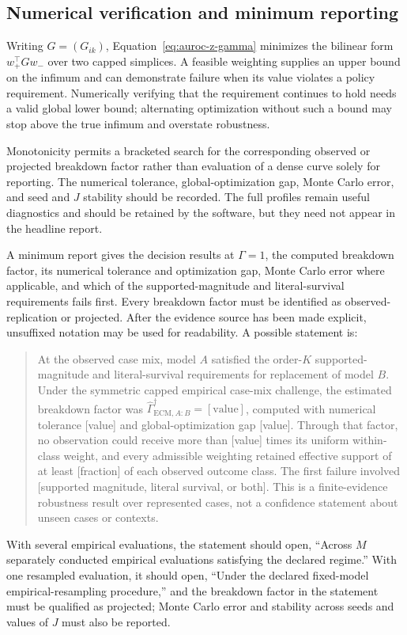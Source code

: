 \documentclass[11pt]{article}
\theoremstyle{remark}
\begin{document}
\subsection{Numerical verification and minimum reporting}

Writing $G=(G_{ik})$, Equation~\eqref{eq:auroc-z-gamma} minimizes the bilinear
form $w_+^\top G w_-$ over two capped simplices. A feasible weighting supplies
an upper bound on the infimum and can demonstrate failure when its value
violates a policy requirement. Numerically verifying that the requirement
continues to hold needs a valid global lower bound; alternating optimization
without such a bound may stop above the true infimum and overstate robustness.

Monotonicity permits a bracketed search for the corresponding observed or
projected breakdown factor rather than evaluation of a dense curve solely for
reporting. The numerical tolerance, global-optimization gap, Monte Carlo error,
and seed and $J$ stability should be recorded. The full profiles remain
useful diagnostics and should be retained by the software, but they need not
appear in the headline report.

A minimum report gives the decision results at $\Gamma=1$, the computed
breakdown factor, its numerical tolerance and optimization gap, Monte Carlo
error where applicable, and which of the supported-magnitude and
literal-survival requirements fails first. Every breakdown factor must be
identified as observed-replication or projected. After the evidence source has
been made explicit, unsuffixed notation may be used for readability. A possible
statement is:
\begin{quote}
At the observed case mix, model $A$ satisfied the order-$K$ supported-magnitude
and literal-survival requirements for replacement of model $B$. Under the
symmetric capped empirical case-mix challenge, the estimated breakdown
factor was $\widehat\Gamma_{\mathrm{ECM},A:B}^{\dagger}=[\text{value}]$,
computed with numerical tolerance [value] and global-optimization gap [value].
Through that factor, no observation could receive more than [value] times its
uniform within-class weight, and every admissible weighting retained effective
support of at least [fraction] of each observed outcome class. The first
failure involved [supported magnitude, literal survival, or both]. This is a
finite-evidence robustness result over represented cases, not a confidence
statement about unseen cases or contexts.
\end{quote}
With several empirical evaluations, the statement should open, ``Across $M$
separately conducted empirical evaluations satisfying the declared regime.''
With one resampled evaluation, it should open, ``Under the declared fixed-model
empirical-resampling procedure,'' and the breakdown factor in the statement
must be qualified as projected; Monte Carlo error and stability across seeds
and values of $J$ must also be reported.
\end{document}
